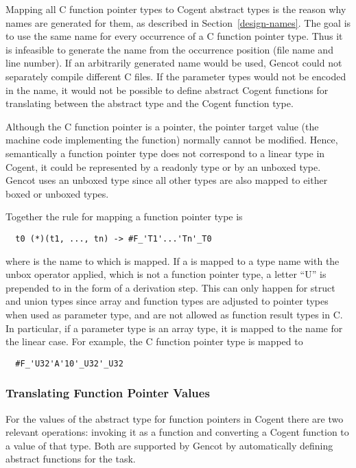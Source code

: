 Mapping all C function pointer types to Cogent abstract types is the reason why names are generated for them, as
described in Section~\ref{design-names}. The goal is to use the same name for every occurrence of a C 
function pointer type. Thus it is infeasible to generate the name from 
the occurrence position (file name and line number). If an arbitrarily generated name would be used, 
Gencot could not separately compile different C files. If the parameter types would not be encoded in
the name, it would not be possible to define abstract Cogent functions for translating between the
abstract type and the Cogent function type.

Although the C function pointer is a pointer, the pointer target value (the machine code implementing the function) 
normally cannot be modified. Hence, semantically a function pointer type does not correspond to a linear type
in Cogent, it could be represented by a readonly type or by an unboxed type. Gencot uses an unboxed type
since all other types are also mapped to either boxed or unboxed types. 

Together the rule for mapping a function pointer type is
\begin{verbatim}
  t0 (*)(t1, ..., tn) -> #F_'T1'...'Tn'_T0
\end{verbatim}
where  is the name to which  is mapped.
If a  is mapped to a type name with the unbox operator applied, which is not a function pointer type,
a letter ``U'' is prepended to  in the form of a derivation step. This can only happen for struct and union types
since array and function types are adjusted to pointer types when used as parameter type, and are not allowed as 
function result types in C. In particular, if a parameter type  is an array type, it is mapped to
the name for the linear case. For example, the C function pointer type  is mapped to
\begin{verbatim}
  #F_'U32'A'10'_U32'_U32
\end{verbatim}

\subsubsection{Translating Function Pointer Values}

For the values of the abstract type for function pointers in Cogent there are two relevant operations: invoking
it as a function and converting a Cogent function to a value of that type. Both are supported by Gencot
by automatically defining abstract functions for the task.

